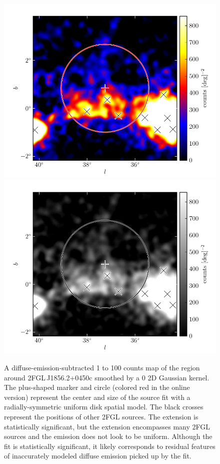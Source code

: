 \clearpage
\begin{figure}
    \ifcolorfigure
    \includegraphics{source_plots/example_bad_fit_color.pdf}
    \else
    \includegraphics{source_plots/example_bad_fit_bw.pdf}
    \fi
    \caption{
    A diffuse-emission-subtracted 1 \gev to 100 \gev counts map of the
    region around 2FGL\,J1856.2+0450c smoothed by a 0 2D Gaussian
    kernel. The plus-shaped marker and circle (colored red in
    the online version) represent the center and size of the source
    fit with a
    radially-symmetric uniform disk spatial model.  The black
    crosses represent the positions of other 2FGL sources.  The extension
    is statistically significant, but the extension encompasses many 2FGL
    sources and the emission does not look to be uniform. Although
    the fit is statistically significant, it likely corresponds to
    residual features of inaccurately modeled diffuse emission picked
    up by the fit. 
    }
\end{figure}




